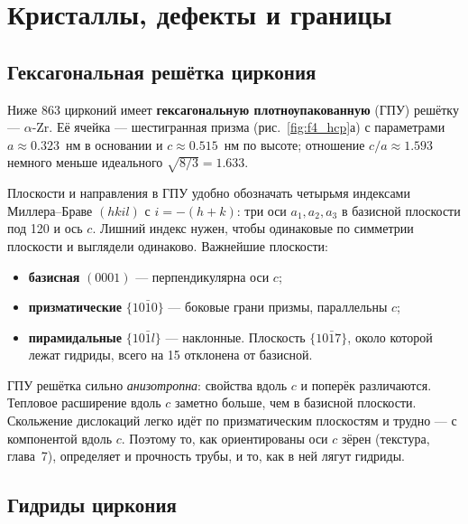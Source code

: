 \chapter{Кристаллы, дефекты и границы}

\section{Гексагональная решётка циркония}

Ниже 863\degC{} цирконий имеет \textbf{гексагональную плотноупакованную} (ГПУ) решётку --- $\alpha$-Zr.
Её ячейка --- шестигранная призма (рис.~\ref{fig:f4_hcp}а) с параметрами $a \approx 0.323$~нм в основании и
$c\approx 0.515$~нм по высоте; отношение $c/a\approx1.593$ немного меньше идеального $\sqrt{8/3}=1.633$.

Плоскости и направления в ГПУ удобно обозначать четырьмя индексами Миллера--Браве $(hkil)$ с $i = -(h+k)$:
три оси $a_1, a_2, a_3$ в базисной плоскости под 120\textdegree{} и ось $c$. Лишний индекс нужен, чтобы
одинаковые по симметрии плоскости и выглядели одинаково. Важнейшие плоскости:
\begin{itemize}
\item \textbf{базисная} $(0001)$ --- перпендикулярна оси $c$;
\item \textbf{призматические} $\{10\bar10\}$ --- боковые грани призмы, параллельны $c$;
\item \textbf{пирамидальные} $\{10\bar1l\}$ --- наклонные. Плоскость $\{10\bar17\}$, около которой лежат
  гидриды, всего на 15\textdegree{} отклонена от базисной.
\end{itemize}


\begin{idea}
ГПУ решётка сильно \emph{анизотропна}: свойства вдоль $c$ и поперёк различаются. Тепловое расширение вдоль
$c$ заметно больше, чем в базисной плоскости. Скольжение дислокаций легко идёт по призматическим плоскостям и
трудно --- с компонентой вдоль $c$. Поэтому то, как ориентированы оси $c$ зёрен (текстура, глава~7), определяет и
прочность трубы, и то, как в ней лягут гидриды.
\end{idea}

\section{Гидриды циркония}

